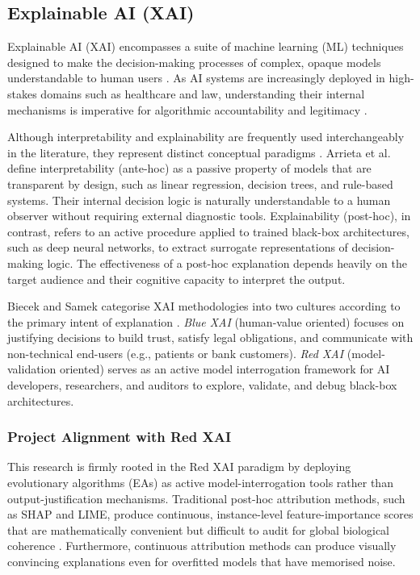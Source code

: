 \subsection{Explainable AI (XAI)}\label{sec:xai}

Explainable AI (XAI) encompasses a suite of machine learning (ML) techniques designed to make the decision-making processes of complex, opaque models understandable to human users \citep{arrieta2020}. As AI systems are increasingly deployed in high-stakes domains such as healthcare and law, understanding their internal mechanisms is imperative for algorithmic accountability and legitimacy \citep{arrieta2020,guidotti2021}.

Although interpretability and explainability are frequently used interchangeably in the literature, they represent distinct conceptual paradigms \citep{arrieta2020}. Arrieta et al.\ \citeyearpar{arrieta2020} define interpretability (ante-hoc) as a passive property of models that are transparent by design, such as linear regression, decision trees, and rule-based systems. Their internal decision logic is naturally understandable to a human observer without requiring external diagnostic tools. Explainability (post-hoc), in contrast, refers to an active procedure applied to trained black-box architectures, such as deep neural networks, to extract surrogate representations of decision-making logic. The effectiveness of a post-hoc explanation depends heavily on the target audience and their cognitive capacity to interpret the output.

Biecek and Samek \citeyearpar{biecek2024} categorise XAI methodologies into two cultures according to the primary intent of explanation \citep{biecek2024}. \textit{Blue XAI} (human-value oriented) focuses on justifying decisions to build trust, satisfy legal obligations, and communicate with non-technical end-users (e.g., patients or bank customers). \textit{Red XAI} (model-validation oriented) serves as an active model interrogation framework for AI developers, researchers, and auditors to explore, validate, and debug black-box architectures.

\subsubsection{Project Alignment with Red XAI}\label{sec:red-xai-alignment}

This research is firmly rooted in the Red XAI paradigm by deploying evolutionary algorithms (EAs) as active model-interrogation tools rather than output-justification mechanisms. Traditional post-hoc attribution methods, such as SHAP and LIME, produce continuous, instance-level feature-importance scores that are mathematically convenient but difficult to audit for global biological coherence \citep{slack2020}. Furthermore, continuous attribution methods can produce visually convincing explanations even for overfitted models that have memorised noise.

